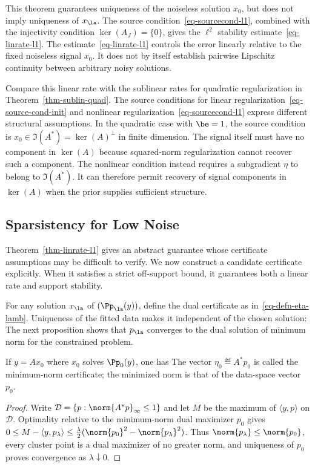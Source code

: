 This theorem guarantees uniqueness of the noiseless solution $x_0$, but does not imply uniqueness of $x_\la$.
%
The source condition~\eqref{eq-sourcecond-l1}, combined with the injectivity condition $\ker(A_{J})=\{0\}$, gives the $\ell^2$ stability estimate~\eqref{eq-linrate-l1}.
%
The estimate~\eqref{eq-linrate-l1} controls the error linearly relative to the fixed noiseless signal $x_0$. It does not by itself establish pairwise Lipschitz continuity between arbitrary noisy solutions.


Compare this linear rate with the sublinear rates for quadratic regularization in Theorem~\ref{thm-sublin-quad}.
%
The source conditions for linear regularization~\eqref{eq-source-cond-init} and nonlinear regularization~\eqref{eq-sourcecond-l1} express different structural assumptions.
%
In the quadratic case with $\be=1$, the source condition is $x_0\in\Im(A^*)=\ker(A)^\bot$ in finite dimension. The signal itself must have no component in $\ker(A)$ because squared-norm regularization cannot recover such a component.
%
The nonlinear condition instead requires a subgradient $\eta$ to belong to $\Im(A^*)$. It can therefore permit recovery of signal components in $\ker(A)$ when the prior supplies sufficient structure.

 
 
\subsection{Sparsistency for Low Noise}
\label{sec-sparsistency}

Theorem~\ref{thm-linrate-l1} gives an abstract guarantee whose certificate assumptions may be difficult to verify.
%
We now construct a candidate certificate explicitly. When it satisfies a strict off-support bound, it guarantees both a linear rate and support stability.


For any solution $x_\la$ of $(\Pp_\la(y))$, define the dual certificate as in~\eqref{eq-defn-eta-lamb}. Uniqueness of the fitted data makes it independent of the chosen solution:
The next proposition shows that $p_\la$ converges to the dual solution of minimum norm for the constrained problem.

\begin{prop}
	If $y = A x_0$ where $x_0$ solves $\Pp_0(y)$, one has
	The vector $\eta_0\eqdef A^*p_0$ is called the minimum-norm certificate; the minimized norm is that of the data-space vector $p_0$.
\end{prop}
\begin{proof}
	Write $\mathcal D=\{p:\norm{A^*p}_\infty\leq1\}$ and let $M$ be the maximum of $\langle y,p\rangle$ on $\mathcal D$. Optimality relative to the minimum-norm dual maximizer $p_0$ gives $0\leq M-\langle y,p_\lambda\rangle\leq\frac\lambda2(\norm{p_0}^2-\norm{p_\lambda}^2)$. Thus $\norm{p_\lambda}\leq\norm{p_0}$, every cluster point is a dual maximizer of no greater norm, and uniqueness of $p_0$ proves convergence as $\lambda\downarrow0$.
\end{proof}

